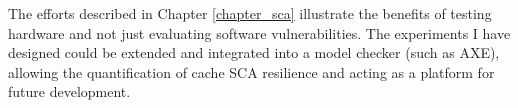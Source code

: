 			The efforts described in Chapter \ref{chapter_sca} illustrate the benefits of testing hardware and not just evaluating software vulnerabilities. The experiments I have designed could be extended and integrated into a model checker (such as AXE), allowing the quantification of cache SCA resilience and acting as a platform for future development.
			
	
			

